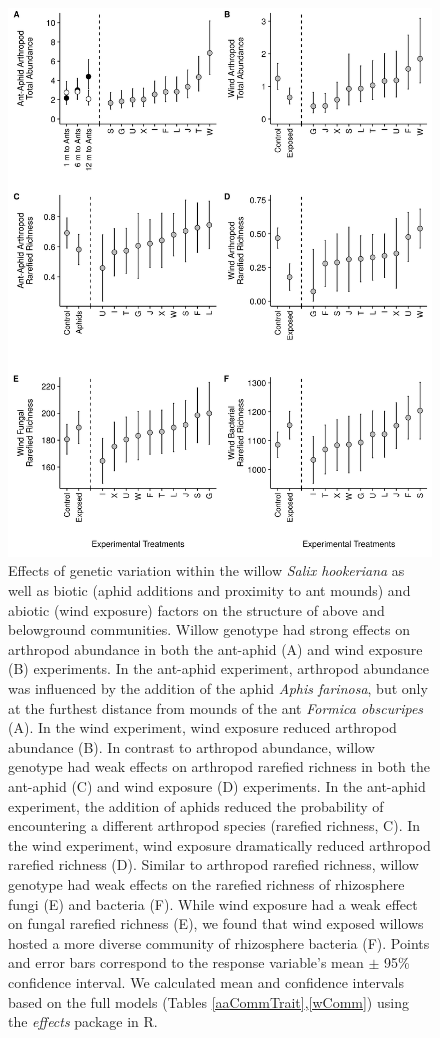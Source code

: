 \documentclass[11pt]{article}
\begin{document}
\begin{figure}%
\centering
\includegraphics[scale = 0.5]{fig_1.png}
\caption{Effects of genetic variation within the willow
\textit{Salix hookeriana} as well as biotic (aphid additions and proximity
to ant mounds) and abiotic (wind exposure) factors on the structure of
above and belowground communities. Willow genotype had strong effects on
arthropod abundance in both the ant-aphid (A) and wind exposure (B)
experiments. In the ant-aphid experiment, arthropod abundance was
influenced by the addition of the aphid \textit{Aphis farinosa}, but only
at the furthest distance from mounds of the ant \textit{Formica
obscuripes} (A). In the wind experiment, wind exposure reduced arthropod
abundance (B). In contrast to arthropod abundance, willow genotype had weak
effects on arthropod rarefied richness in both the ant-aphid (C) and
wind exposure (D) experiments. In the ant-aphid experiment, the
addition of aphids reduced the probability of encountering a different
arthropod species (rarefied richness, C). In the wind experiment, wind
exposure dramatically reduced arthropod rarefied richness (D). Similar to
arthropod rarefied richness, willow genotype had weak effects on the
rarefied richness of rhizosphere fungi (E) and bacteria (F). While wind
exposure had a weak effect on fungal rarefied richness (E), we found
that wind exposed willows hosted a more diverse community of rhizosphere
bacteria (F). Points and error bars correspond to the response
variable's mean $\pm$ 95\% confidence interval. We calculated mean and confidence intervals based on the full models (Tables \ref{aaCommTrait},\ref{wComm}) using the \textit{effects} package in R.}
\label{Fig:GxEuni}
\end{figure}
\end{document}
